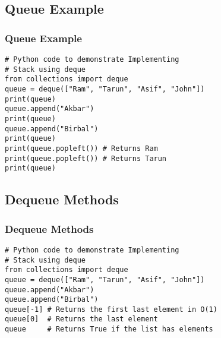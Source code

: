 \documentclass{beamer}
\begin{document}
\begin{frame}[fragile]
\subsection{Queue Example}
\frametitle{Queue Example}
\begin{lstlisting}
# Python code to demonstrate Implementing  
# Stack using deque 
from collections import deque 
queue = deque(["Ram", "Tarun", "Asif", "John"]) 
print(queue) 
queue.append("Akbar") 
print(queue) 
queue.append("Birbal") 
print(queue) 
print(queue.popleft()) # Returns Ram
print(queue.popleft()) # Returns Tarun   
print(queue) 
\end{lstlisting}
\end{frame}


\begin{frame}[fragile]
\section{Dequeue Methods}
\frametitle{Dequeue Methods}
\begin{lstlisting}
# Python code to demonstrate Implementing  
# Stack using deque 
from collections import deque 
queue = deque(["Ram", "Tarun", "Asif", "John"]) 
queue.append("Akbar") 
queue.append("Birbal") 
queue[-1] # Returns the first last element in O(1)
queue[0]  # Returns the last element
queue     # Returns True if the list has elements
\end{lstlisting}
\end{frame}
\end{document}
